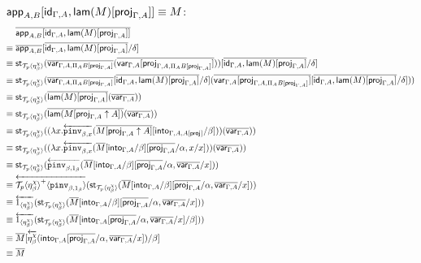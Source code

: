 \documentclass[10pt]{article}
\theoremstyle{definition}
\newcommand{\id}{\mathsf{id}}
\newcommand{\rewrite}[2]{\overleftarrow{#1}(#2)}
\newcommand\UI[2]{\ensuremath{\lambda #1.#2}}
\newcommand\StI[2]{\ensuremath{\mathsf{st}_{#1}(#2)}}
\newcommand\ApEl[2]{\mathcal{T}_{#1}\langle#2\rangle}
\newcommand\ApPlus[2]{\ensuremath{{#1}^+ \langle #2 \rangle }}
\begin{document}
\begin{enumerate}[style = multiline, labelwidth = 80pt]
\item[{$\qapp{A,B}[\id_{\Gamma, A}, \qlam(M)[\proj{\Gamma, A}]] \equiv M$}:] 
\begin{align*}
&\upstairs{\qapp{A,B}[\id_{\Gamma, A}, \qlam(M)[\proj{\Gamma, A}]]} \\
\equiv{} &\upstairs{\qapp{A,B}}[\upstairs{\id_{\Gamma, A}, \qlam(M)[\proj{\Gamma, A}]}/\delta] \\
\equiv{} &\StI{\ApEl{p}{\eta^\chi_\beta}}{\upstairs{\qvar{\Gamma, A, \Pi_A B[\proj{\Gamma, A}]}}(\upstairs{\qvar{\Gamma, A}[\proj{\Gamma, A, \Pi_A B[\proj{\Gamma, A}]}]})}[\upstairs{\id_{\Gamma, A}, \qlam(M)[\proj{\Gamma, A}]}/\delta] \\
\equiv{} &\StI{\ApEl{p}{\eta^\chi_\beta}}{\upstairs{\qvar{\Gamma, A, \Pi_A B[\proj{\Gamma, A}]}}[\upstairs{\id_{\Gamma, A}, \qlam(M)[\proj{\Gamma, A}]}/\delta](\upstairs{\qvar{\Gamma, A}[\proj{\Gamma, A, \Pi_A B[\proj{\Gamma, A}]}]}[\upstairs{\id_{\Gamma, A}, \qlam(M)[\proj{\Gamma, A}]}/\delta])} \\
\equiv{} &\StI{\ApEl{p}{\eta^\chi_\beta}}{\upstairs{\qlam(M)[\proj{\Gamma, A}]}(\upstairs{\qvar{\Gamma, A}})} \\
\equiv{} &\StI{\ApEl{p}{\eta^\chi_\beta}}{\upstairs{\qlam(M[\proj{\Gamma, A} \uparrow A])}(\upstairs{\qvar{\Gamma, A}})} \\
\equiv{} &\StI{\ApEl{p}{\eta^\chi_\beta}}{(\UI{x}{\rewrite{\pinv{\beta,x}}{\upstairs{M[\proj{\Gamma, A} \uparrow A]}[\into{\Gamma, A, A[\proj{}]}/\beta]}})(\upstairs{\qvar{\Gamma, A}})} \\
\equiv{} &\StI{\ApEl{p}{\eta^\chi_\beta}}{(\UI{x}{\rewrite{\pinv{\beta,x}}{\upstairs{M}[\into{\Gamma, A}/\beta][\upstairs{\proj{\Gamma, A}}/\alpha, x/x]}})(\upstairs{\qvar{\Gamma, A}})} \\
\equiv{} &\StI{\ApEl{p}{\eta^\chi_\beta}}{\rewrite{\pinv{\beta,1_\beta}}{\upstairs{M}[\into{\Gamma, A}/\beta][\upstairs{\proj{\Gamma, A}}/\alpha, \upstairs{\qvar{\Gamma, A}}/x]}} \\
\equiv{} &\rewrite{\ApPlus{\ApEl{p}{\eta^\chi_\beta}}{\pinv{\beta,1_\beta}}}{\StI{\ApEl{p}{\eta^\chi_\beta}}{\upstairs{M}[\into{\Gamma, A}/\beta][\upstairs{\proj{\Gamma, A}}/\alpha, \upstairs{\qvar{\Gamma, A}}/x]}} \\
\equiv{} &\rewrite{\ApOne{\eta^\chi_\beta}}{\StI{\ApEl{p}{\eta^\chi_\beta}}{\upstairs{M}[\into{\Gamma, A}/\beta][\upstairs{\proj{\Gamma, A}}/\alpha, \upstairs{\qvar{\Gamma, A}}/x]}} \\
\equiv{} &\rewrite{\ApOne{\eta^\chi_\beta}}{\StI{\ApEl{p}{\eta^\chi_\beta}}{\upstairs{M}[\into{\Gamma, A}[\upstairs{\proj{\Gamma, A}}/\alpha, \upstairs{\qvar{\Gamma, A}}/x]/\beta]}} \\
\equiv{} &\upstairs{M}[\rewrite{\eta^\chi_\beta}{\into{\Gamma, A}[\upstairs{\proj{\Gamma, A}}/\alpha, \upstairs{\qvar{\Gamma, A}}/x]}/\beta] \\
\equiv{} &\upstairs{M}
\end{align*} 


\end{enumerate}
\end{document}
